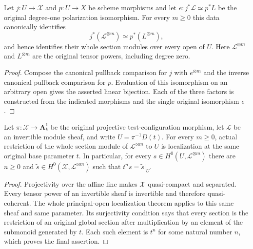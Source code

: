 \begin{corollary}
\label{cor:tc-seven-original-power-identification}
Let $j:U\to\mathcal X$ and $p:U\to X$ be scheme morphisms and let
$e:j^*\mathcal L\simeq p^*L$ be the original degree-one
polarization isomorphism.  For every $m\geq0$ this data canonically
identifies
\[
 j^*(\mathcal L^{\otimes m})\simeq p^*(L^{\otimes m}),
\]
and hence identifies their whole section modules over every open of
$U$.  Here $\mathcal L^{\otimes m}$ and $L^{\otimes m}$ are the
original tensor powers, including degree zero.
\leanok
\end{corollary}
\begin{proof}
Compose the canonical pullback comparison for $j$ with
$e^{\otimes m}$ and the inverse canonical pullback comparison for
$p$.  Evaluation of this isomorphism on an arbitrary open gives the
asserted linear bijection.  Each of the three factors is constructed
from the indicated morphisms and the single original isomorphism $e$.
\end{proof}

\begin{lemma}
\label{lem:tc-seven-power-section-denominators}
Let $\pi:\mathcal X\to\mathbf A^1_k$ be the original projective
test-configuration morphism, let $\mathcal L$ be an invertible module
sheaf, and write $U=\pi^{-1}D(t)$.  For every $m\geq0$, actual
restriction of the whole section module of $\mathcal L^{\otimes m}$
to $U$ is localization at the same original base parameter $t$.
In particular, for every $s\in H^0(U,\mathcal L^{\otimes m})$
there are $n\geq0$ and
$\widetilde s\in H^0(\mathcal X,\mathcal L^{\otimes m})$ such that
$t^n s=\widetilde s|_U$.
\leanok
\end{lemma}
\begin{proof}
Projectivity over the affine line makes $\mathcal X$ quasi-compact
and separated.  Every tensor power of an invertible sheaf is
invertible and therefore quasi-coherent.  The whole principal-open
localization theorem applies to this same sheaf and same parameter.
Its surjectivity condition says that every section is the
restriction of an original global section after multiplication by
an element of the submonoid generated by $t$.  Each such element is
$t^n$ for some natural number $n$, which proves the final assertion.
\end{proof}


